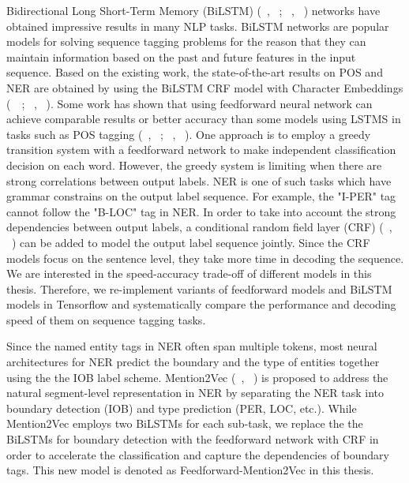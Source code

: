 \documentclass{sfuthesis}
\begin{document}
Bidirectional Long Short-Term Memory (BiLSTM) (~\citeauthor{Hochreiter97longshort-term}, ~\citeyear{Hochreiter97longshort-term}; ~\citeauthor{graves2005framewise}, ~\citeyear{graves2005framewise}) networks have obtained impressive results in many NLP tasks. BiLSTM networks are popular models for solving sequence tagging problems for the reason that they can maintain information based on the past and future features in the input sequence. Based on the existing work, the state-of-the-art results on POS and NER are obtained by using the BiLSTM CRF model with Character Embeddings (~\citeauthor{ling2015finding}~\citeyear{ling2015finding}; ~\citeauthor{lample2016neural}, ~\citeyear{lample2016neural}). Some work has shown that using feedforward neural network can achieve comparable results or better accuracy than some models using LSTMS in tasks such as POS tagging (~\citeauthor{schmid1994part}, ~\citeyear{schmid1994part}; ~\citeauthor{andor2016globally}, ~\citeyear{andor2016globally}). One approach is to employ a greedy transition system with a feedforward network to make independent classification decision on each word. However, the greedy system is limiting when there are strong correlations between output labels. NER is one of such tasks which have grammar constrains on the output label sequence. For example, the "I-PER" tag cannot follow the "B-LOC" tag in NER. In order to take into account the strong dependencies between output labels, a conditional random field layer (CRF) (~\citeauthor{lafferty2001conditional}, ~\~\citeyear{lafferty2001conditional}) can be added to model the output label sequence jointly. Since the CRF models focus on the sentence level, they take more time in decoding the sequence. We are interested in the speed-accuracy trade-off of different models in this thesis. Therefore, we re-implement variants of feedforward models and BiLSTM models in Tensorflow and systematically compare the performance and decoding speed of them on sequence tagging tasks.

Since the named entity tags in NER often span multiple tokens, most neural architectures for NER predict the boundary and the type of entities together using the the IOB label scheme. Mention2Vec (~\citeauthor{stratos2016mention2vec}, ~\citeyear{stratos2016mention2vec}) is proposed to address the natural segment-level representation in NER by separating the NER task into boundary detection (IOB) and type prediction (PER, LOC, etc.). While Mention2Vec employs two BiLSTMs for each sub-task, we replace the the BiLSTMs for boundary detection with the feedforward network with CRF in order to accelerate the classification and capture the dependencies of boundary tags. This new model is denoted as Feedforward-Mention2Vec in this thesis.
\end{document}
